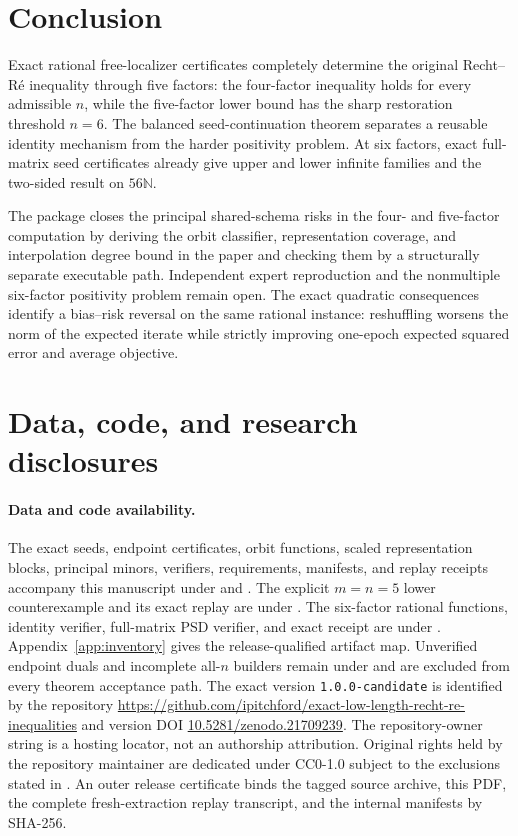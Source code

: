 \documentclass[11pt]{article}
\begin{document}
\section{Conclusion}\label{sec:conclusion}

Exact rational free-localizer certificates completely determine the original
Recht--R\'e inequality through five factors: the four-factor inequality holds
for every admissible \(n\), while the five-factor lower bound has the sharp
restoration threshold \(n=6\).  The balanced seed-continuation theorem
separates a reusable identity mechanism from the harder positivity problem.
At six factors, exact full-matrix seed certificates already give upper and
lower infinite families and the two-sided result on \(56\mathbb N\).

The package closes the principal shared-schema risks in the four- and
five-factor computation by deriving the orbit classifier, representation
coverage, and interpolation degree bound in the paper and checking them by a
structurally separate executable path.  Independent expert reproduction and
the nonmultiple six-factor positivity problem remain open.  The exact
quadratic consequences identify a bias--risk reversal on the same rational
instance: reshuffling worsens the norm of the expected iterate while strictly
improving one-epoch expected squared error and average objective.

\section{Data, code, and research disclosures}\label{sec:disclosures}

\paragraph{Data and code availability.}
The exact seeds, endpoint certificates, orbit functions, scaled representation blocks, principal minors, verifiers, requirements, manifests, and replay receipts accompany this manuscript under
 and .  The explicit \(m=n=5\) lower counterexample and its exact replay are under
.  The six-factor rational functions,
identity verifier, full-matrix PSD verifier, and exact receipt are under
.  Appendix~\ref{app:inventory} gives the
release-qualified artifact map.  Unverified endpoint duals and incomplete
all-\(n\) builders remain under  and are excluded from
every theorem acceptance path.  The exact version
\texttt{1.0.0-candidate} is identified by the repository
\url{https://github.com/ipitchford/exact-low-length-recht-re-inequalities}
and version DOI
\href{https://doi.org/10.5281/zenodo.21709239}{10.5281/zenodo.21709239}.
The repository-owner string is a hosting locator, not an authorship
attribution.
Original rights held by the repository maintainer are dedicated under
CC0-1.0 subject to the exclusions stated in .  An
outer release certificate binds the tagged source archive, this PDF, the
complete fresh-extraction replay transcript, and the internal manifests by
SHA-256.
\end{document}
